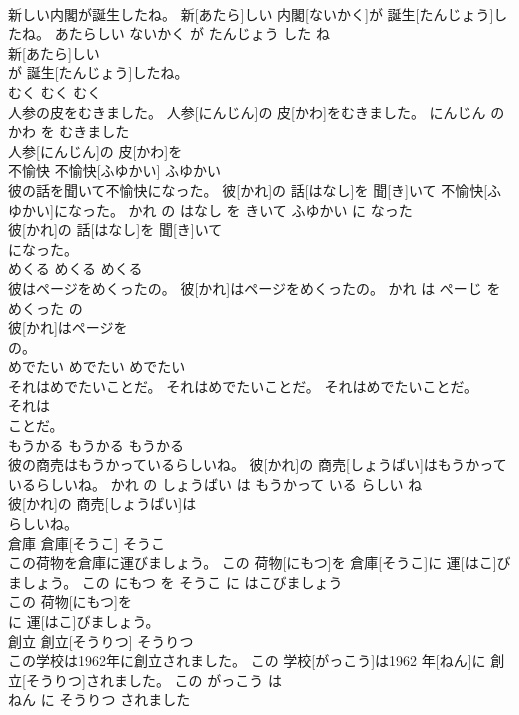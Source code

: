 \documentclass[8pt]{extreport}
\begin{document}
\begin{CJK}{UTF8}{min}
\\	新しい内閣が誕生したね。	新[あたら]しい 内閣[ないかく]が 誕生[たんじょう]したね。	あたらしい ないかく が たんじょう した ね	
\\	新[あたら]しい
\\	が 誕生[たんじょう]したね。			
\\	むく	むく	むく	
\\	人参の皮をむきました。	人参[にんじん]の 皮[かわ]をむきました。	にんじん の かわ を むきました	
\\	人参[にんじん]の 皮[かわ]を
\\	不愉快	不愉快[ふゆかい]	ふゆかい	
\\	彼の話を聞いて不愉快になった。	彼[かれ]の 話[はなし]を 聞[き]いて 不愉快[ふゆかい]になった。	かれ の はなし を きいて ふゆかい に なった	
\\	彼[かれ]の 話[はなし]を 聞[き]いて
\\	になった。			
\\	めくる	めくる	めくる	
\\	彼はページをめくったの。	彼[かれ]はページをめくったの。	かれ は ぺーじ を めくった の	
\\	彼[かれ]はページを
\\	の。			
\\	めでたい	めでたい	めでたい	
\\	それはめでたいことだ。	それはめでたいことだ。	それはめでたいことだ。	
\\	それは
\\	ことだ。			
\\	もうかる	もうかる	もうかる	
\\	彼の商売はもうかっているらしいね。	彼[かれ]の 商売[しょうばい]はもうかっているらしいね。	かれ の しょうばい は もうかって いる らしい ね	
\\	彼[かれ]の 商売[しょうばい]は
\\	らしいね。			
\\	倉庫	倉庫[そうこ]	そうこ	
\\	この荷物を倉庫に運びましょう。	この 荷物[にもつ]を 倉庫[そうこ]に 運[はこ]びましょう。	この にもつ を そうこ に はこびましょう	
\\	この 荷物[にもつ]を
\\	に 運[はこ]びましょう。			
\\	創立	創立[そうりつ]	そうりつ	
\\	この学校は1962年に創立されました。	この 学校[がっこう]は1962 年[ねん]に 創立[そうりつ]されました。	この がっこう は 
\\	ねん に そうりつ されました	

\end{CJK}
\end{document}
